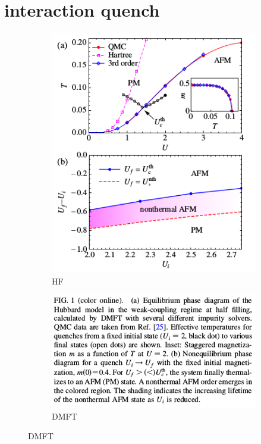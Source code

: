 \section{interaction quench}

\begin{figure}[H]
\begin{subfigure}{.5\textwidth}
 \includegraphics[width=0.9\linewidth]{interaction_quench_AFM/AFM_DMFT_phase.png}
  \caption{HF}
\end{subfigure}%
\begin{subfigure}{.5\textwidth}
  \includegraphics[width=0.9\linewidth]{interaction_quench_AFM/AFM_DMFT_phase_text.png}
  \caption{DMFT}
\end{subfigure}
\end{figure}


